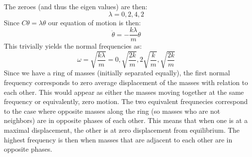 The zeroes (and thus the eigen values) are then:
\begin{equation}
    \lambda = 0, 2, 4, 2
\end{equation}
Since $C\theta = \lambda\theta$ our equation of motion is then:
\begin{equation}
    \ddot{\theta} = -\frac{k\lambda}{m}\theta
\end{equation}
This trivially yields the normal frequencies as:
\begin{equation}
    \omega = \sqrt{\frac{k\lambda}{m}} = 0, \sqrt{\frac{2k}{m}}, 2\sqrt{\frac{k}{m}}, \sqrt{\frac{2k}{m}}
\end{equation}
Since we have a ring of masses (initially separated equally), the first normal frequency corresponds to zero average displacement of the masses with relation to each other. This would appear as either the masses moving together at the same frequency or equivalently, zero motion. The two equivalent frequnecies correspond to the case where opposite masses along the ring (so masses who are not neighbors) are in opposite phases of each other. This means that when one is at a maximal displacement, the other is at zero displacement from equilibrium. The highest frequency is then when masses that are adjacent to each other are in opposite phases. 